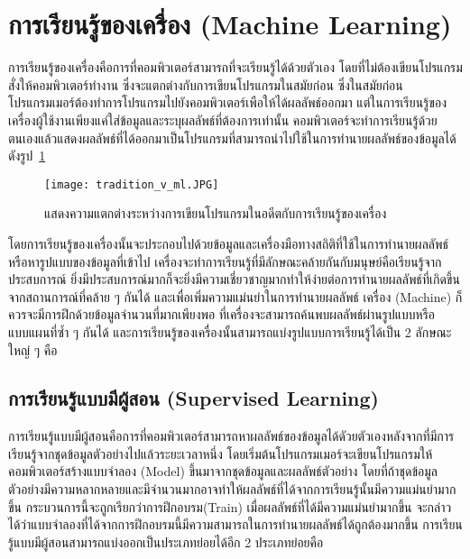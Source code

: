\section{การเรียนรู้ของเครื่อง (Machine Learning)}
การเรียนรู้ของเครื่องคือการที่คอมพิวเตอร์สามารถที่จะเรียนรู้ได้ด้วยตัวเอง โดยที่ไม่ต้องเขียนโปรแกรมสั่งให้คอมพิวเตอร์ทำงาน 
ซึ่งจะแตกต่างกับการเขียนโปรแกรมในสมัยก่อน ซึ่งในสมัยก่อนโปรแกรมเมอร์ต้องทำการโปรแกรมไปยังคอมพิวเตอร์เพือให้ได้ผลลัพธ์ออกมา 
แต่ในการเรียนรู้ของเครื่องผู้ใช้งานเพียงแค่ใส่ข้อมูลและระบุผลลัพธ์ที่ต้องการเท่านั้น 
คอมพิวเตอร์จะทำการเรียนรู้ด้วยตนเองแล้วแสดงผลลัพธ์ที่ได้ออกมาเป็นโปรแกรมที่สามารถนำไปใช้ในการทำนายผลลัพธ์ของข้อมูลได้ดังรูป~\ref{Fig:tradition_vs_ml}

\begin{figure}[h]
    \centering
    \texttt{[image: tradition\_v\_ml.JPG]}
    \caption{แสดงความแตกต่างระหว่างการเขียนโปรแกรมในอดีตกับการเรียนรู้ของเครื่อง}
    \label{Fig:tradition_vs_ml}
\end{figure}
\FloatBarrier

โดยการเรียนรู้ของเครื่องนั้นจะประกอบไปด้วยข้อมูลและเครื่องมือทางสถิติที่ใช้ในการทำนายผลลัพธ์หรือหารูปแบบของข้อมูลที่เข้าไป
เครื่องจะทำการเรียนรู้ที่มีลักษณะคล้ายกันกับมนุษย์คือเรียนรู้จากประสบการณ์ 
ยิ่งมีประสบการณ์มากก็จะยิ่งมีความเชี่ยวชาญมากทำให้ง่ายต่อการทำนายผลลัพธ์ที่เกิดขึ้นจากสถานการณ์ที่คล้าย ๆ กันได้
และเพื่อเพิ่มความแม่นยำในการทำนายผลลัพธ์ เครื่อง (Machine) ก็ควรจะมีการฝึกด้วยข้อมูลจำนวนที่มากเพียงพอ 
ที่เครื่องจะสามารถค้นพบผลลัพธ์ผ่านรูปแบบหรือแบบแผนที่ซ้ำ ๆ กันได้ และการเรียนรู้ของเครื่องนั้นสามารถแบ่งรูปแบบการเรียนรู้ได้เป็น 2 ลักษณะใหญ่ ๆ คือ

\subsection{การเรียนรู้แบบมีผู้สอน (Supervised Learning)}
การเรียนรู้แบบมีผู้สอนคือการที่คอมพิวเตอร์สามารถหาผลลัพธ์ของข้อมูลได้ดัวยตัวเองหลังจากที่มีการเรียนรู้จากชุดข้อมูลตัวอย่างไปแล้วระยะเวลาหนึ่ง 
โดยเริ่มต้นโปรแกรมเมอร์จะเขียนโปรแกรมให้คอมพิวเตอร์สร้างแบบจำลอง (Model) 
ขึ้นมาจากชุดข้อมูลและผลลัพธ์ตัวอย่าง โดยที่ถ้าชุดข้อมูลตัวอย่างมีความหลากหลายและมีจำนวนมากอาจทำให้ผลลัพธ์ที่ได้จากการเรียนรู้นั้นมีความแม่นยำมากขึ้น 
กระบวนการนี้จะถูกเรียกว่าการฝึกอบรม(Train) เมื่อผลลัพธ์ที่ได้มีความแม่นยำมากขึ้น 
จะกล่าวได้ว่าแบบจำลองที่ได้จากการฝึกอบรมนี้มีความสามารถในการทำนายผลลัพธ์ได้ถูกต้องมากขึ้น 
การเรียนรู้แบบมีผู้สอนสามารถแบ่งออกเป็นประเภทย่อยได้อีก 2 ประเภทย่อยคือ

